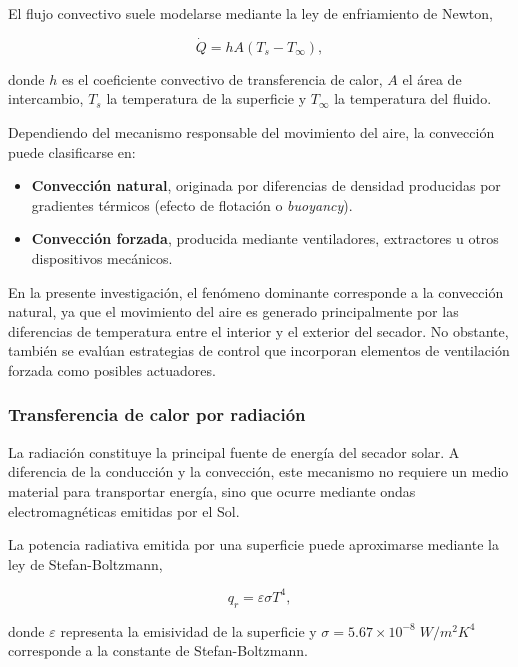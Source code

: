 El flujo convectivo suele modelarse mediante la ley de enfriamiento de Newton,

\begin{equation}
\dot Q=hA(T_s-T_\infty),
\label{eq:newton}
\end{equation}

donde $h$ es el coeficiente convectivo de transferencia de calor, $A$ el área de intercambio, $T_s$ la temperatura de la superficie y $T_\infty$ la temperatura del fluido.

Dependiendo del mecanismo responsable del movimiento del aire, la convección puede clasificarse en:

\begin{itemize}
\item \textbf{Convección natural}, originada por diferencias de densidad producidas por gradientes térmicos (efecto de flotación o \textit{buoyancy}).

\item \textbf{Convección forzada}, producida mediante ventiladores, extractores u otros dispositivos mecánicos.
\end{itemize}

En la presente investigación, el fenómeno dominante corresponde a la convección natural, ya que el movimiento del aire es generado principalmente por las diferencias de temperatura entre el interior y el exterior del secador. No obstante, también se evalúan estrategias de control que incorporan elementos de ventilación forzada como posibles actuadores.

\subsubsection{Transferencia de calor por radiación}

La radiación constituye la principal fuente de energía del secador solar. A diferencia de la conducción y la convección, este mecanismo no requiere un medio material para transportar energía, sino que ocurre mediante ondas electromagnéticas emitidas por el Sol.

La potencia radiativa emitida por una superficie puede aproximarse mediante la ley de Stefan-Boltzmann,

\begin{equation}
q_r=\varepsilon\sigma T^4,
\label{eq:stefan}
\end{equation}

donde $\varepsilon$ representa la emisividad de la superficie y $\sigma=5.67\times10^{-8}\;W/m^2K^4$ corresponde a la constante de Stefan-Boltzmann.

